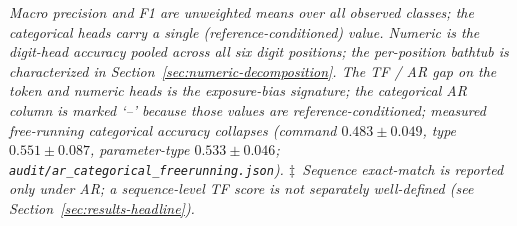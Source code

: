 \begin{table}[!t]
\footnotesize\textit{Macro precision and F1 are unweighted means over all observed classes; the categorical heads carry a single (reference-conditioned) value. Numeric is the digit-head accuracy pooled across all six digit positions; the per-position bathtub is characterized in Section~\ref{sec:numeric-decomposition}. The TF / AR gap on the token and numeric heads is the exposure-bias signature; the categorical AR column is marked `--' because those values are reference-conditioned; measured free-running categorical accuracy collapses (command $0.483 \pm 0.049$, type $0.551 \pm 0.087$, parameter-type $0.533 \pm 0.046$; \texttt{audit/ar\_categorical\_freerunning.json}). $\ddagger$~Sequence exact-match is reported only under AR; a sequence-level TF score is not separately well-defined (see Section~\ref{sec:results-headline}).}
\end{table}
